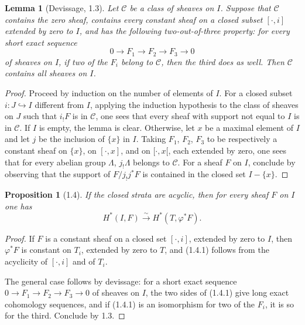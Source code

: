 \documentclass[11pt]{article}
\newtheorem{proposition}[theorem]{Proposition}
\newtheorem{lemma}[theorem]{Lemma}
\theoremstyle{definition}
\begin{document}
\begin{lemma}[Devissage, 1.3]
Let $\mathcal C$ be a class of sheaves on $I$.  Suppose that $\mathcal C$ contains the zero sheaf, contains every constant sheaf on a closed subset $[\cdot,i]$ extended by zero to $I$, and has the following two-out-of-three property: for every short exact sequence
\[
0\to F_1\to F_2\to F_3\to 0
\]
of sheaves on $I$, if two of the $F_i$ belong to $\mathcal C$, then the third does as well.  Then $\mathcal C$ contains all sheaves on $I$.
\end{lemma}

\begin{proof}
Proceed by induction on the number of elements of $I$.  For a closed subset $i:J\hookrightarrow I$ different from $I$, applying the induction hypothesis to the class of sheaves on $J$ such that $i_!F$ is in $\mathcal C$, one sees that every sheaf with support not equal to $I$ is in $\mathcal C$.  If $I$ is empty, the lemma is clear.  Otherwise, let $x$ be a maximal element of $I$ and let $j$ be the inclusion of $\{x\}$ in $I$.  Taking $F_1$, $F_2$, $F_3$ to be respectively a constant sheaf on $\{x\}$, on $[\cdot,x]$, and on $[\cdot,x[$, each extended by zero, one sees that for every abelian group $\Lambda$, $j_!\Lambda$ belongs to $\mathcal C$.  For a sheaf $F$ on $I$, conclude by observing that the support of $F/j_!j^*F$ is contained in the closed set $I-\{x\}$.
\end{proof}

\begin{proposition}[1.4]
If the closed strata are acyclic, then for every sheaf $F$ on $I$ one has
\begin{equation}
H^*(I,F)\xrightarrow{\sim}H^*(T,\varphi^*F).\tag{1.4.1}
\end{equation}
\end{proposition}

\begin{proof}
If $F$ is a constant sheaf on a closed set $[\cdot,i]$, extended by zero to $I$, then $\varphi^*F$ is constant on $T_i$, extended by zero to $T$, and (1.4.1) follows from the acyclicity of $[\cdot,i]$ and of $T_i$.

The general case follows by devissage: for a short exact sequence $0\to F_1\to F_2\to F_3\to 0$ of sheaves on $I$, the two sides of (1.4.1) give long exact cohomology sequences, and if (1.4.1) is an isomorphism for two of the $F_i$, it is so for the third.  Conclude by 1.3.
\end{proof}
\end{document}
